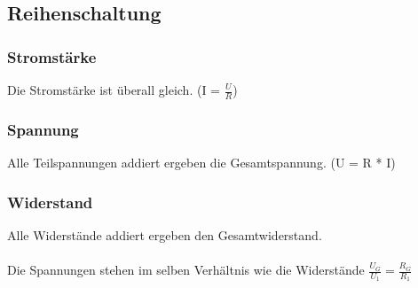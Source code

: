 \documentclass[../../main.tex]{subfiles}
\begin{document}
\subsection{Reihenschaltung}
\subsubsection{Stromstärke}
Die Stromstärke ist überall gleich.
(I = $\frac{U}{R}$)
\subsubsection{Spannung}
Alle Teilspannungen addiert ergeben die Gesamtspannung.
(U = R * I)
\subsubsection{Widerstand}
Alle Widerstände addiert ergeben den Gesamtwiderstand.
\\
\\
Die Spannungen stehen im selben Verhältnis wie die Widerstände
$\frac{U_G}{U_1} = \frac{R_G}{R_1}$
\end{document}
